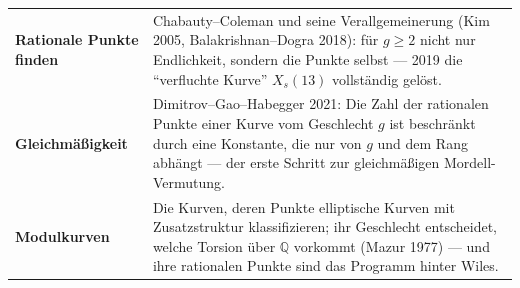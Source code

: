 \begin{forschung}
\begin{center}
{\small
\renewcommand{\arraystretch}{1.45}
\begin{tabular}{@{}P{3.0cm}P{5.2cm}@{}}
\toprule
\textbf{Rationale Punkte finden} & Chabauty--Coleman und seine Verallgemeinerung (Kim 2005, Balakrishnan--Dogra 2018): für $g\ge2$ nicht nur Endlichkeit, sondern die Punkte selbst --- 2019 die \enquote{verfluchte Kurve} $X_s(13)$ vollständig gelöst.\\
\textbf{Gleichmäßigkeit} & Dimitrov--Gao--Habegger 2021: Die Zahl der rationalen Punkte einer Kurve vom Geschlecht $g$ ist beschränkt durch eine Konstante, die nur von $g$ und dem Rang abhängt --- der erste Schritt zur gleichmäßigen Mordell-Vermutung.\\
\textbf{Modulkurven} & Die Kurven, deren Punkte elliptische Kurven mit Zusatzstruktur klassifizieren; ihr Geschlecht entscheidet, welche Torsion über $\mathbb Q$ vorkommt (Mazur 1977) --- und ihre rationalen Punkte sind das Programm hinter Wiles.\\
\bottomrule
\end{tabular}}
\end{center}

\begin{center}
\begin{minipage}{0.88\textwidth}
\end{minipage}
\end{center}
\end{forschung}


